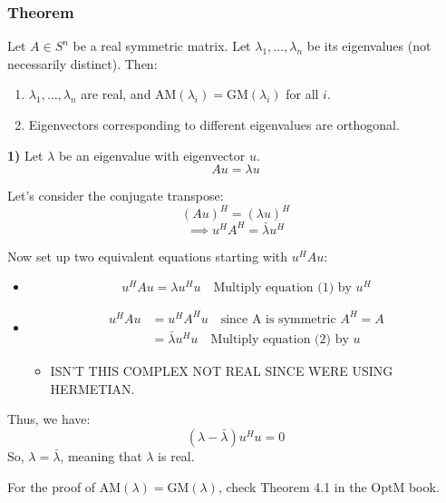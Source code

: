 \subsubsection{Theorem}

\begin{theorem}
    Let $A \in S^n$ be a real symmetric matrix. Let $\lambda_1, \dots, \lambda_n$ be its eigenvalues (not necessarily distinct). Then:
    \begin{enumerate}
        \item $\lambda_1, \dots, \lambda_n$ are real, and $\text{AM}(\lambda_i) = \text{GM}(\lambda_i)$ for all $i$.
        \item Eigenvectors corresponding to different eigenvalues are orthogonal.
    \end{enumerate}
\end{theorem}

\begin{derivation}
        \textbf{1)} Let $\lambda$ be an eigenvalue with eigenvector $u$.
        \[
        A u = \lambda u \tag{1}
        \]
        
        Let's consider the conjugate transpose:
        \[
        (A u)^H = (\lambda u)^H
        \]
        \[
        \implies u^H A^H = \bar{\lambda} u^H \tag{2}
        \]
        \vspace{1em}

        Now set up two equivalent equations starting with $u^H A u$:
        
        \begin{itemize}
            \item
            \[
            u^H A u = \lambda u^H u \quad \text{Multiply equation (1) by $u^H$}
            \]
            \item 
            \begin{align*}
                u^H A u &= u^H A^H u \quad \text{since A is symmetric } A^H = A\\
                &= \bar{\lambda} u^H u \quad \text{Multiply equation (2) by $u$}
            \end{align*}
            \begin{itemize}
                \item ISN'T THIS COMPLEX NOT REAL SINCE WERE USING HERMETIAN.
            \end{itemize}
        \end{itemize}
        \vspace{1em}

        Thus, we have:
        \[
        (\lambda - \bar{\lambda}) u^H u = 0
        \]
        So, $\lambda = \bar{\lambda}$, meaning that $\lambda$ is real.
        \vspace{1em}

        For the proof of $\text{AM}(\lambda) = \text{GM}(\lambda)$, check Theorem 4.1 in the OptM book.
\end{derivation}

